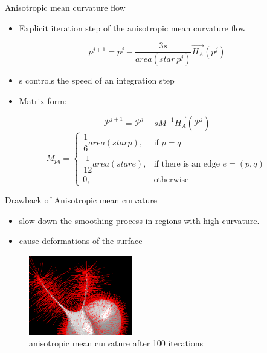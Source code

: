 \documentclass{beamer}
\begin{document}
\begin{frame}{Anisotropic mean curvature flow}
\begin{itemize}
\item Explicit iteration step of the anisotropic mean curvature flow
\end{itemize}
\begin{equation*}
p^{j+1} = p^{j} - \dfrac{3s}{area(star\ p^j)}\vec{H_A}(p^j)
\end{equation*}
\begin{itemize}
\item s controls the speed of an integration step
\item Matrix form:
\end{itemize}
\begin{equation*}
\mathcal{P}^{j+1} = \mathcal{P}^j -sM^{-1}\vec{H_A}(\mathcal{P}^j)
\end{equation*}
\begin{equation*}
M_{pq} = 
\begin{cases} \dfrac{1}{6}area(star p), & \mbox{if } p=q \\ 
\dfrac{1}{12}area(star e), & \mbox{if there is an edge } e=(p, q) \\
0, & \mbox{otherwise} \end{cases}
\end{equation*}
\end{frame}

\begin{frame}{Drawback of Anisotropic mean curvature}
\begin{itemize}
\item slow down the smoothing process in regions with high curvature. 
\item cause deformations of the surface
\end{itemize}
\begin{figure}[htb]
\centering
\includegraphics[width=0.4\textwidth]{aniso_bunny_100it.PNG}
\caption{anisotropic mean curvature after 100 iterations}
\label{fig:deform}
\end{figure}
\end{frame}
\end{document}
